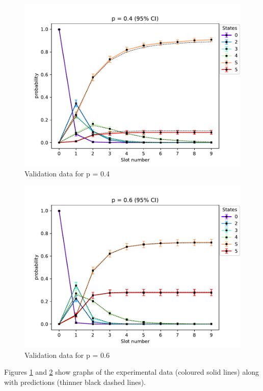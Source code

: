 \begin{figure}[H]
    \begin{center}
        \includegraphics[scale=0.73]{img/star5to1p=0.4validation.pdf}
        \caption{Validation data for p = 0.4}
        \label{fig:5to1validPlot1}
    \end{center}
    \vspace*{-0.8cm}
\end{figure}


\begin{figure}[H]
    \begin{center}
        \includegraphics[scale=0.73]{img/star5to1p=0.6validation.pdf}
        \caption{Validation data for p = 0.6}
        \label{fig:5to1validPlot2}
    \end{center}
    \vspace*{-0.8cm}
\end{figure}

Figures \ref{fig:5to1validPlot1} and \ref{fig:5to1validPlot2} show graphs of the experimental data (coloured solid lines) along with predictions (thinner black dashed lines).
